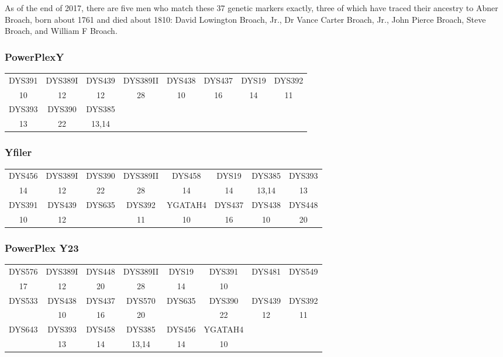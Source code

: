\documentclass[11pt,letter]{book}
\begin{document}
As of the end of 2017, there are five men who match these 37 genetic markers exactly, three of which have traced their ancestry to Abner Broach, born about 1761 and died about 1810:  David Lowington Broach, Jr., Dr Vance Carter Broach, Jr., John Pierce Broach, Steve Broach, and William F Broach.

\subsubsection{PowerPlexY}

\begin{center}
\begin{tabular}{c | c | c | c | c | c | c | c}
	DYS391 & DYS389I & DYS439 & DYS389II & DYS438 & DYS437 & DYS19 & DYS392 \\
	10     & 12      & 12     & 28       & 10     & 16     & 14    & 11     \\
	\hline
	DYS393 & DYS390 & DYS385 \\
	13     & 22     & 13,14 \\
\end{tabular}
\end{center}

\subsubsection{Yfiler}

\begin{center}
\begin{tabular}{c | c | c | c | c | c | c | c}
	DYS456 & DYS389I & DYS390 & DYS389II & DYS458 & DYS19 & DYS385 & DYS393 \\
	14     & 12      & 22     & 28       & 14     & 14    & 13,14  & 13    \\
	\hline
	DYS391 & DYS439 & DYS635 & DYS392 & YGATAH4 & DYS437 & DYS438 & DYS448 \\
	10     & 12     &        & 11     & 10      & 16     & 10     & 20 \\
\end{tabular}
\end{center}

\subsubsection{PowerPlex Y23}

\begin{center}
\begin{tabular}{c | c | c | c | c | c | c | c}
	DYS576 & DYS389I & DYS448 & DYS389II & DYS19 & DYS391 & DYS481 & DYS549\\
	17     & 12      & 20     & 28       & 14     & 10    &        &       \\
	\hline
	DYS533 & DYS438 & DYS437 & DYS570 & DYS635 & DYS390 & DYS439 & DYS392 \\
	       & 10     & 16     & 20     &        &  22    & 12     & 11     \\
	\hline
	DYS643 & DYS393 & DYS458 & DYS385 & DYS456 & YGATAH4 \\
	       & 13     & 14     & 13,14  & 14     & 10 \\
\end{tabular}
\end{center}
\end{document}
